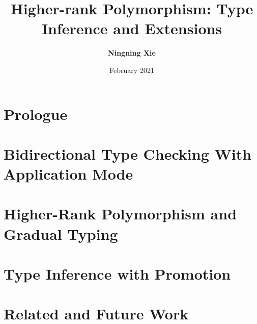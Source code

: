 

\title{Higher-rank Polymorphism: Type Inference and Extensions}
\author{\textbf{Ningning Xie}}
\date{February 2021}




\maketitle

\begin{abstract}
 
\end{abstract}


\frontmatter
\makedeclaration
\makeAck
\tableofcontents
\listoffigures
\listoftables

\mainmatter

\part{Prologue}





\part{Bidirectional Type Checking With Application Mode} \label{part:typeinference}



\part{Higher-Rank Polymorphism and Gradual Typing}
\label{part:gradual}




\part{Type Inference with Promotion} \label{part:dependentTypes}






\part{Related and Future Work}

